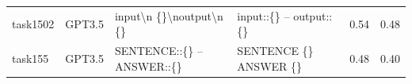 \begin{longtable}{@{}p{0.8cm\tiny}p{1cm\tiny}p{4.1cm\ttfamily\tiny}p{4.1cm\ttfamily\tiny}p{0.8cm\tiny}p{0.8cm\tiny}@{}}
task1502  & GPT3.5    & input\textbackslash{}n \{\}\textbackslash{}noutput\textbackslash{}n \{\}                                                                                                                                                                                                                                                                                                                                                                                                                                                & input::\{\} -- output::\{\}                                                                                                                                                                                                                                                                                                                                                                                                                                                                                                                                                       & 0.54 & 0.48 \\
task155   & GPT3.5    & SENTENCE::\{\} -- ANSWER::\{\}                                                                                                                                                                                                                                                                                                                                                                                                                                                                                          & SENTENCE \{\} ANSWER \{\}                                                                                                                                                                                                                                                                                                                                                                                                                                                                                                                                                         & 0.48 & 0.40 \\

\end{longtable}
